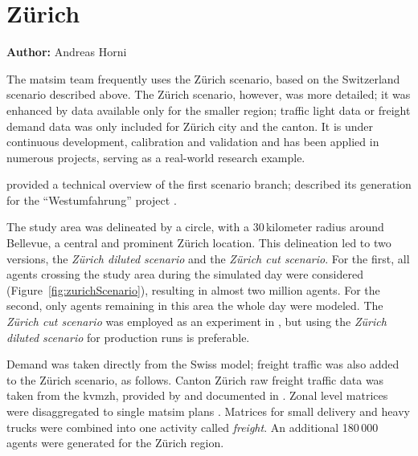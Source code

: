 \chapter{Zürich}
\label{ch:zhscenario}
\hfill \textbf{Author:} Andreas Horni


The \gls{matsim} team frequently uses the Zürich scenario, based on the Switzerland scenario described above. The Zürich scenario, however, was more detailed; it was enhanced by data available only for the smaller region; \eg traffic light data or freight demand data was only included for Zürich city and the canton. It is under continuous development, calibration and validation and has been applied in numerous projects, serving as a real-world research example.   

\citet{HorniEtAl_TechRep_IVT_2011_a} provided a technical overview of the first scenario branch; \citet[][]{BalmerEtAl_ResRep_bdktzrh_2009} described its generation for the ``Westumfahrung'' project . 

The study area was delineated by a circle, with a 30\,kilometer radius around Bellevue, a central and prominent Zürich location. This delineation led to two versions,  the \emph{Zürich diluted scenario} and the \emph{Zürich cut scenario}. For the first, all agents crossing the study area during the simulated day were considered (Figure~\ref{fig:zurichScenario}), resulting in almost two million agents. For the second, only agents remaining in this area the whole day were modeled. The \emph{Zürich cut scenario} was employed as an experiment in \citet[][]{Hackney_PhDThesis_2009}, but using the \emph{Zürich diluted scenario} for production runs is preferable.

Demand was taken directly from the Swiss model; freight traffic was also added to the Zürich scenario, as follows. Canton Zürich raw freight traffic data was taken from the \gls{kvmzh}, provided by \citet{AMV_Webpage_2011} and documented in \citet[][]{GottardiBuergler_SV_1999}. Zonal level matrices were disaggregated to single \gls{matsim} plans \citep[][]{ShahM_TechRep_IVT_2010}. Matrices for small delivery and heavy trucks were combined into one activity called \emph{freight}. An additional 180\,000 agents were generated for the Zürich region.

